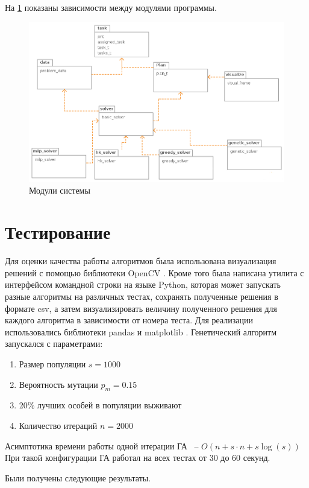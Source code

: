 \documentclass[a4paper,14pt,russian]{article}
\begin{document}
На \cref{fig:modules} показаны зависимости между модулями программы.
\pagebreak
\begin{figure}[here]
\includegraphics[scale=0.5]{images/group-control.png}
\caption{Модули системы}
\label{fig:modules}
\end{figure}

\section{Тестирование}
Для оценки качества работы алгоритмов была использована визуализация решений с помощью библиотеки OpenCV \cite{bradski2008learning}.
Кроме того была написана утилита с интерфейсом командной строки на языке Python, которая может запускать разные алгоритмы на различных тестах, сохранять полученные решения в формате csv, а затем визуализировать величину полученного решения для каждого алгоритма в зависимости от номера теста.
Для реализации использовались библиотеки pandas \cite{mckinney2010data} и matplotlib \cite{hunter2007matplotlib}. Генетический алгоритм запускался с параметрами:
\begin{enumerate}
\item Размер популяции $s = 1000$
\item Вероятность мутации $p_m = 0.15$
\item 20\% лучших особей в популяции выживают
\item Количество итераций $n = 2000$
\end{enumerate}
Асимптотика времени работы одной итерации ГА ~-- $O(n + s\cdot n + s\log(s))$
При такой конфигурации ГА работал на всех тестах от 30 до 60 секунд.

Были получены следующие результаты.
\end{document}
